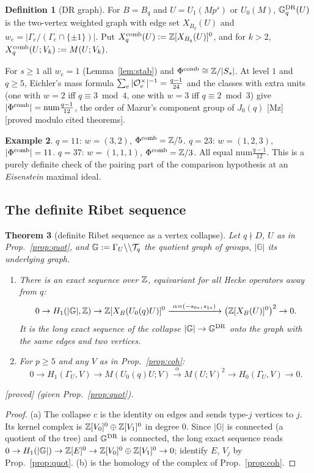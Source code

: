 \documentclass[11pt]{amsart}
\theoremstyle{plain}
\newtheorem{theorem}{Theorem}[section]
\theoremstyle{definition}
\newtheorem{definition}[theorem]{Definition}
\newtheorem{example}[theorem]{Example}
\theoremstyle{remark}
\newcommand{\status}[1]{\textup{\textsf{[#1]}}}
\newcommand{\stproved}{\status{proved}}
\newcommand{\stpmc}{\status{proved modulo cited theorems}}
\newcommand{\G}{\mathbb{G}}\newcommand{\Iw}{\mathrm{Iw}}\newcommand{\Hb}{\mathfrak{H}}
\begin{document}
\begin{definition}[DR graph]\label{def:DR}
For $B=B_q$ and $U=U_1(Mp^s)$ or $U_0(M)$, $\G^{\rm DR}_q(U)$ is the two-vertex weighted graph with edge set $X_{B_q}(U)$ and $w_e=|\Gamma_e/(\Gamma_e\cap\{\pm1\})|$. Put $X^{\rm comb}_q(U):=\mathbb{Z}[X_{B_q}(U)]^0$, and for $k>2$, $X^{\rm comb}_q(U;V_k):=M(U;V_k)$.
\end{definition}
For $s\ge1$ all $w_e=1$ (Lemma~\ref{lem:stab}) and $\Phi^{\rm comb}\cong\mathbb{Z}/|S_s|$.
At level $1$ and $q\ge5$, Eichler's mass formula $\sum_e|\mathcal{O}_e^\times|^{-1}=\frac{q-1}{24}$ and the classes with extra units (one with $w=2$ iff $q\equiv3\bmod4$, one with $w=3$ iff $q\equiv2\bmod3$) give $|\Phi^{\rm comb}|=\mathrm{num}\frac{q-1}{12}$, the order of Mazur's component group of $J_0(q)$ [Mz] \stpmc.

\begin{example}\label{ex:mazur}
$q=11$: $w=(3,2)$, $\Phi^{\rm comb}=\mathbb{Z}/5$. $q=23$: $w=(1,2,3)$, $|\Phi^{\rm comb}|=11$. $q=37$: $w=(1,1,1)$, $\Phi^{\rm comb}=\mathbb{Z}/3$. All equal $\mathrm{num}\frac{q-1}{12}$. This is a purely definite check of the pairing part of the comparison hypothesis at an \emph{Eisenstein} maximal ideal.
\end{example}

\subsection{The definite Ribet sequence}
\begin{theorem}[definite Ribet sequence as a vertex collapse]\label{thm:ribet}
Let $q\nmid D$, $U$ as in Prop.~\ref{prop:quot}, and $\G:=\Gamma_U\backslash\backslash\cT_q$ the quotient graph of groups, $|\G|$ its underlying graph.
\begin{enumerate}[label=(\alph*)]
\item There is an exact sequence over $\mathbb{Z}$, equivariant for all Hecke operators away from $q$:
\[0\to H_1(|\G|,\Z)\to\Z[X_B(U_0(q)U)]^0\xrightarrow{\ \alpha=(-s_{0*},\,s_{1*})\ }\big(\Z[X_B(U)]^0\big)^{2}\to0.\]
It is the long exact sequence of the collapse $|\G|\to\G^{\rm DR}$ onto the graph with the same edges and two vertices.
\item For $p\ge5$ and any $V$ as in Prop.~\ref{prop:coh}:
\[0\to H_1(\Gamma_U,V)\to M(U_0(q)U;V)\xrightarrow{\alpha}M(U;V)^{2}\to H_0(\Gamma_U,V)\to0.\]
\end{enumerate}
\stproved{} (given Prop.~\ref{prop:quot}).
\end{theorem}
\begin{proof}
(a) The collapse $c$ is the identity on edges and sends type-$j$ vertices to $j$. Its kernel complex is $\mathbb{Z}[V_0]^0\oplus\mathbb{Z}[V_1]^0$ in degree $0$. Since $|\G|$ is connected (a quotient of the tree) and $\G^{\rm DR}$ is connected, the long exact sequence reads $0\to H_1(|\G|)\to\Z[E]^0\to\Z[V_0]^0\oplus\Z[V_1]^0\to0$; identify $E$, $V_j$ by Prop.~\ref{prop:quot}. (b) is the homology of the complex of Prop.~\ref{prop:coh}.
\end{proof}
\end{document}

